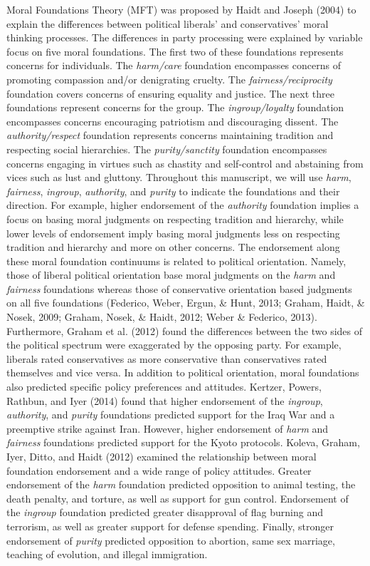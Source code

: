 \documentclass[english,man]{apa6}
\newcounter{author}
\theoremstyle{definition}
\theoremstyle{definition}
\theoremstyle{definition}
\theoremstyle{remark}
\begin{document}
Moral Foundations Theory (MFT) was proposed by Haidt and Joseph (2004)
to explain the differences between political liberals' and
conservatives' moral thinking processes. The differences in party
processing were explained by variable focus on five moral foundations.
The first two of these foundations represents concerns for individuals.
The \emph{harm/care} foundation encompasses concerns of promoting
compassion and/or denigrating cruelty. The \emph{fairness/reciprocity}
foundation covers concerns of ensuring equality and justice. The next
three foundations represent concerns for the group. The
\emph{ingroup/loyalty} foundation encompasses concerns encouraging
patriotism and discouraging dissent. The \emph{authority/respect}
foundation represents concerns maintaining tradition and respecting
social hierarchies. The \emph{purity/sanctity} foundation encompasses
concerns engaging in virtues such as chastity and self-control and
abstaining from vices such as lust and gluttony. Throughout this
manuscript, we will use \emph{harm}, \emph{fairness}, \emph{ingroup},
\emph{authority}, and \emph{purity} to indicate the foundations and
their direction. For example, higher endorsement of the \emph{authority}
foundation implies a focus on basing moral judgments on respecting
tradition and hierarchy, while lower levels of endorsement imply basing
moral judgments less on respecting tradition and hierarchy and more on
other concerns. The endorsement along these moral foundation continuums
is related to political orientation. Namely, those of liberal political
orientation base moral judgments on the \emph{harm} and \emph{fairness}
foundations whereas those of conservative orientation based judgments on
all five foundations (Federico, Weber, Ergun, \& Hunt, 2013; Graham,
Haidt, \& Nosek, 2009; Graham, Nosek, \& Haidt, 2012; Weber \& Federico,
2013). Furthermore, Graham et al. (2012) found the differences between
the two sides of the political spectrum were exaggerated by the opposing
party. For example, liberals rated conservatives as more conservative
than conservatives rated themselves and vice versa. In addition to
political orientation, moral foundations also predicted specific policy
preferences and attitudes. Kertzer, Powers, Rathbun, and Iyer (2014)
found that higher endorsement of the \emph{ingroup}, \emph{authority},
and \emph{purity} foundations predicted support for the Iraq War and a
preemptive strike against Iran. However, higher endorsement of
\emph{harm} and \emph{fairness} foundations predicted support for the
Kyoto protocols. Koleva, Graham, Iyer, Ditto, and Haidt (2012) examined
the relationship between moral foundation endorsement and a wide range
of policy attitudes. Greater endorsement of the \emph{harm} foundation
predicted opposition to animal testing, the death penalty, and torture,
as well as support for gun control. Endorsement of the \emph{ingroup}
foundation predicted greater disapproval of flag burning and terrorism,
as well as greater support for defense spending. Finally, stronger
endorsement of \emph{purity} predicted opposition to abortion, same sex
marriage, teaching of evolution, and illegal immigration.
\end{document}
